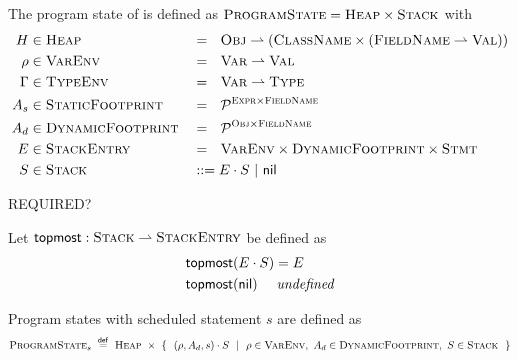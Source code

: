 The program state of \svl is defined as $\textsc{ProgramState} = \textsc{Heap} \times \textsc{Stack}$ with
\begin{align*}
	H      & \in \textsc{Heap}       &  & =~~ \textsc{Obj} \rightharpoonup (\textsc{ClassName} \times (\textsc{FieldName} \rightharpoonup \textsc{Val})) \\
	\rho   & \in \textsc{VarEnv}     &  & =~~ \textsc{Var} \rightharpoonup \textsc{Val}                                                        \\
	\Gamma & \in \textsc{TypeEnv}    &  & =~~ \textsc{Var} \rightharpoonup \textsc{Type}                                                       \\
	A_s    & \in \textsc{StaticFootprint} &  & =~~ \mathcal{P}^{\textsc{Expr} \times \textsc{FieldName}}                                                    \\
	A_d    & \in \textsc{DynamicFootprint} &  & =~~ \mathcal{P}^{\textsc{Obj} \times \textsc{FieldName}}                                                     \\
	E      & \in \textsc{StackEntry} &  & =~~ \textsc{VarEnv} \times \textsc{DynamicFootprint} \times \textsc{Stmt}                                       \\
	S      & \in \textsc{Stack}      &  & ::= E \cdot S ~|~ \textup{\textsf{nil}}
\end{align*}

REQUIRED?
\begin{definition}
    Let $\textup{\textsf{topmost}} : \textsc{Stack} \rightharpoonup \textsc{StackEntry}$ be defined as
    \begin{align*}
    &\textup{\textsf{topmost}}(E \cdot S) = E\\
    &\textup{\textsf{topmost}}(\textup{\textsf{nil}}) \quad\textit{ undefined}
    \end{align*}
\end{definition}




Program states with scheduled statement $s$ are defined as
\begin{displaymath}
\textsc{ProgramState}_s ~\overset{\textup{\textsf{def}}}{=}~ \textsc{Heap} ~\times~ \{~~ (\rho, A_d, s) \cdot S ~~|~~ \rho \in \textsc{VarEnv},~ A_d \in \textsc{DynamicFootprint},~ S \in \textsc{Stack} ~~\}
\end{displaymath}
